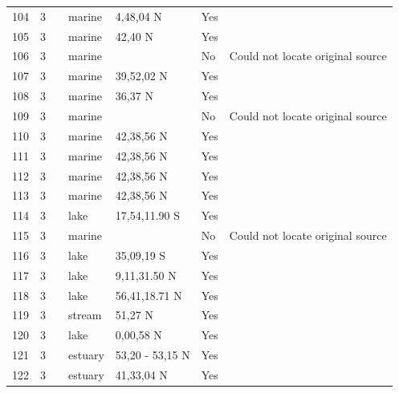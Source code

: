 \documentclass[12pt]{article}
\begin{document}
\begin{landscape}
\begin{table}[h!]
{\begin{tabular}{p{2.8cm}p{1.3cm}p{3cm}p{2.2cm}p{2.5cm}lp{8.2cm}}
        104   & 3 & \cite{Menge1976}  & marine & 4,48,04 N & Yes   &       \\
        105   & 3 & \cite{Edwards1982}  & marine & 42,40 N & Yes   &       \\
        106   & 3 & \cite{Glynn1965}  & marine &       & No    & Could not locate original source \\
        107   & 3 & \cite{Peterson1979}  & marine & 39,52,02 N & Yes   &       \\
        108   & 3 & \cite{Hewatt1937}  & marine & 36,37 N & Yes   &       \\
        109   & 3 & \cite{Castilla1981} & marine &       & No    & Could not locate original source \\
        110   & 3 & \cite{Dexter1947}  & marine & 42,38,56 N & Yes   &       \\
        111   & 3 & \cite{Dexter1947}  & marine & 42,38,56 N & Yes   &       \\
        112   & 3 & \cite{Dexter1947}  & marine & 42,38,56 N & Yes   &       \\
        113   & 3 & \cite{Dexter1947}  & marine & 42,38,56 N & Yes   &       \\
        114   & 3 & \cite{Marshall1982}  & lake  & 17,54,11.90 S & Yes   &       \\
        115   & 3 & \cite{Koepcke1952}  & marine &       & No    & Could not locate original source \\
        116   & 3 & \cite{Hurlbert1972}  & lake  & 35,09,19 S & Yes   &       \\
        117   & 3 & \cite{Zaret1973}  & lake  & 9,11,31.50 N & Yes   &       \\
        118   & 3 & \cite{Bindloss1972}  & lake  & 56,41,18.71 N & Yes   &       \\
        119   & 3 & \cite{Mann1972}  & stream & 51,27 N & Yes   &       \\
        120   & 3 & \cite{Moriarty1973}  & lake  & 0,00,58 N & Yes   &       \\
        121   & 3 & \cite{VanEs1977}  & estuary & 53,20 - 53,15 N & Yes   &       \\
        122   & 3 & \cite{Nixon1973}  & estuary & 41,33,04 N & Yes   &       \\
        \hline
      \end{tabular}}%
      \end{table}

        \newpage



\end{landscape}
\end{document}

